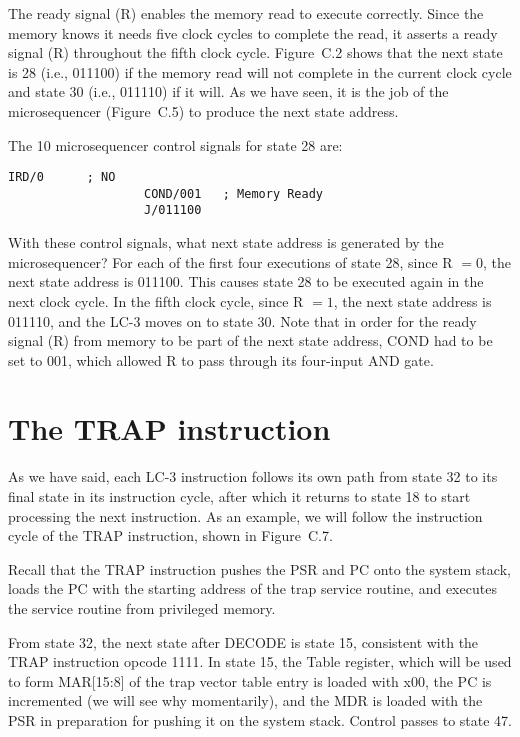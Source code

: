 \documentclass{patt}
\begin{document}
The ready signal (R) enables the memory read to execute correctly.
Since the memory knows it needs five clock cycles to complete the
read, it asserts a ready signal (R) throughout the fifth clock cycle.
Figure~C.2 shows that the next state is 28 (i.e., 011100) if the
memory read will not complete in the current clock cycle and state 30
(i.e., 011110) if it will.  As we have seen, it is the job of the
microsequencer (Figure~C.5) to produce the next state address.


The 10 microsequencer control signals for state 28 are:

\begin{lstlisting}[style=intext]
                   IRD/0      ; NO
                   COND/001   ; Memory Ready
                   J/011100
\end{lstlisting}

\noindent With these control signals, what next state address is generated
by the microsequencer?  For each of the first four executions of state
28, since R $=0$, the next state address is 011100.  This causes state
28 to be executed again in the next clock cycle.  In the fifth clock
cycle, since R $=1$, the next state address is 011110, and the LC-3
moves on to state 30.  Note that in order for the ready signal (R)
from memory to be part of the next state address, COND had to be set
to 001, which allowed R to pass through its four-input AND gate.

\section{The TRAP instruction}

As we have said, each LC-3 instruction follows its own path from state 32
to its final state in its instruction cycle, after which it returns to state 18
to start processing the next instruction.  As an example, we will follow the 
instruction cycle of the TRAP instruction, shown in Figure~C.7.

Recall that the TRAP instruction pushes the PSR and PC onto the system stack,
loads the PC with the starting address of the trap service routine, and 
executes the service routine from privileged memory.

From state 32, the next state after DECODE is state 15, consistent with the
TRAP instruction opcode 1111.  In state 15, the Table register, which will be
used to form MAR[15:8] of the trap vector table entry is loaded with x00, the
PC is incremented (we will see why momentarily), and the MDR is loaded with the
PSR in preparation for pushing it on the system stack.  Control passes to 
state 47.  
\end{document}
